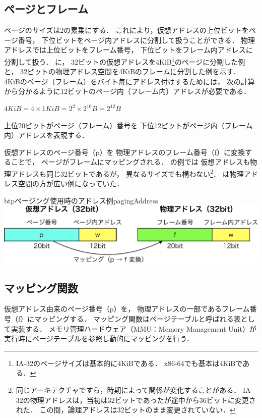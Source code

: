 \subsection{ページとフレーム}
ページのサイズは2の累乗にする．
これにより，仮想アドレスの上位ビットをページ番号，
下位ビットをページ内アドレスに分割して扱うことができる．
物理アドレスでは上位ビットをフレーム番号，
下位ビットをフレーム内アドレスに分割して扱う．
に，
32ビットの仮想アドレスを4KiB\footnote{
  IA-32のページサイズは基本的に4KiBである．
  x86-64でも基本は4KiBである．}のページに分割した例と，
32ビットの物理アドレス空間を4KiBのフレームに分割した例を示す．
4KiBのページ（フレーム）をバイト毎にアドレス付けするためには，
次の計算から分かるように12ビットのページ内（フレーム内）アドレスが必要である．
\centerline{$4KiB = 4 \times 1KiB = 2^2 \times 2^{10}B = 2^{12}B$}
上位20ビットがページ（フレーム）番号を
下位12ビットがページ内（フレーム内）アドレスを表現する．

仮想アドレスのページ番号（p）を
物理アドレスのフレーム番号（f）に変換することで，
ページがフレームにマッピングされる．
の例では
仮想アドレスも物理アドレスも同じ32ビットであるが，
異なるサイズでも構わない\footnote{
  同じアーキテクチャですら，時期によって関係が変化することがある．
  IA-32の物理アドレスは，当初は32ビットであったが途中から36ビットに変更された．
  この間，論理アドレスは32ビットのまま変更されていない．}．
は物理アドレス空間の方が広い例になっていた．

\begin{myfig}{btp}{ページング使用時のアドレス例}{pagingAddress}
  \includegraphics[scale=0.66]{Fig/pagingAddress-crop.pdf}
\end{myfig}

\subsection{マッピング関数}
仮想アドレス由来のページ番号（p）を，
物理アドレスの一部であるフレーム番号（f）にマッピングする．
マッピング関数はページテーブルと呼ばれる表として実装する．
メモリ管理ハードウェア（MMU：Memory Management Unit）が
実行時にページテーブルを参照し動的にマッピングを行う．

